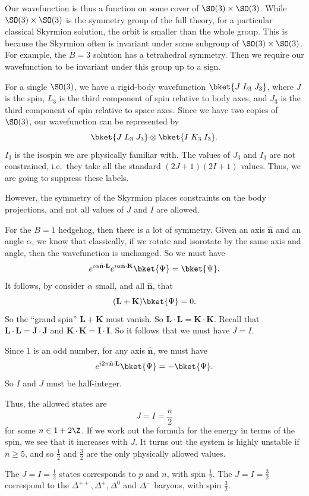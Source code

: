 \documentclass[a4paper]{article}
\begin{document}
Our wavefunction is thus a function on some cover of $\SO(3) \times \SO(3)$. While $\SO(3) \times \SO(3)$ is the symmetry group of the full theory, for a particular classical Skyrmion solution, the orbit is smaller than the whole group. This is because the Skyrmion often is invariant under some subgroup of $\SO(3) \times \SO(3)$. For example, the $B = 3$ solution has a tetrahedral symmetry. Then we require our wavefunction to be invariant under this group up to a sign.

For a single $\SO(3)$, we have a rigid-body wavefunction $\bket{J\; L_3\; J_3}$, where $J$ is the spin, $L_3$ is the third component of spin relative to body axes, and $J_3$ is the third component of spin relative to space axes. Since we have two copies of $\SO(3)$, our wavefunction can be represented by
\[
  \bket{J\; L_3\; J_3} \otimes \bket{I\; K_3\; I_3}.
\]
$I_3$ is the isospin we are physically familiar with. The values of $J_3$ and $I_3$ are not constrained, i.e.\ they take all the standard $(2J + 1)(2I + 1)$ values. Thus, we are going to suppress these labels.

However, the symmetry of the Skyrmion places constraints on the body projections, and not all values of $J$ and $I$ are allowed.

\begin{eg}
  For the $B = 1$ hedgehog, then there is a lot of symmetry. Given an axis $\hat{\mathbf{n}}$ and an angle $\alpha$, we know that classically, if we rotate and isorotate by the same axis and angle, then the wavefunction is unchanged. So we must have
  \[
    e^{i \alpha \hat{\mathbf{n}} \cdot \mathbf{L}} e^{i \alpha \hat{\mathbf{n}} \cdot \mathbf{K}} \bket{\Psi} = \bket{\Psi}.
  \]
  It follows, by consider $\alpha$ small, and all $\hat{\mathbf{n}}$, that
  \[
    (\mathbf{L} + \mathbf{K}) \bket{\Psi} = 0.
  \]
  So the ``grand spin'' $\mathbf{L} + \mathbf{K}$ must vanish. So $\mathbf{L} \cdot \mathbf{L} = \mathbf{K} \cdot \mathbf{K}$. Recall that $\mathbf{L} \cdot \mathbf{L} = \mathbf{J} \cdot \mathbf{J}$ and $\mathbf{K} \cdot \mathbf{K} = \mathbf{I} \cdot \mathbf{I}$. So it follows that we must have $J = I$.

  Since $1$ is an odd number, for any axis $\hat{\mathbf{n}}$, we must have
  \[
    e^{i 2\pi \hat{\mathbf{n}} \cdot \mathbf{L}} \bket{\Psi} = - \bket{\Psi}.
  \]
  So $I$ and $J$ must be half-integer.

  Thus, the allowed states are
  \[
    J = I = \frac{n}{2}
  \]
  for some $n \in 1 + 2\Z$. If we work out the formula for the energy in terms of the spin, we see that it increases with $J$. It turns out the system is highly unstable if $n \geq 5$, and so $\frac{1}{2}$ and $\frac{3}{2}$ are the only physically allowed values.

  The $J = I = \frac{1}{2}$ states corresponds to $p$ and $n$, with spin $\frac{1}{2}$. The $J = I = \frac{3}{2}$ correspond to the $\Delta^{++}, \Delta^+, \Delta^0$ and $\Delta^-$ baryons, with spin $\frac{3}{2}$.
\end{eg}
\end{document}
